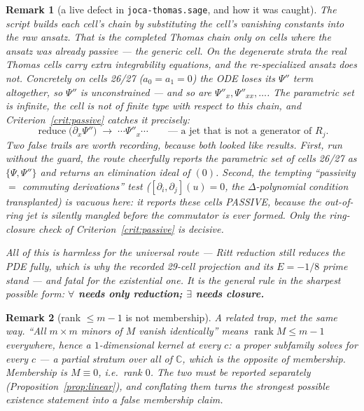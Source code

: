 \documentclass[11pt]{article}
\newcommand{\Psib}{\Psi}
\newcommand{\code}[1]{\texttt{#1}}
\newtheorem{remark}{Remark}
\begin{document}
\begin{remark}[a live defect in \code{joca-thomas.sage}, and how it was caught]
\label{rem:spec-not-passive}
The script builds each cell's chain by substituting the cell's vanishing
constants into the \emph{raw} ansatz. That is the completed Thomas chain only on
cells where the ansatz was \emph{already} passive --- the generic cell. On the
degenerate strata the real Thomas cells carry extra integrability equations, and
the re-specialized ansatz does not. Concretely on cells 26/27 ($a_0=a_1=0$) the
ODE loses its $\Psib''$ term \emph{altogether}, so $\Psib''$ is unconstrained ---
and so are $\Psib''_x, \Psib''_{xx}, \dots$. The parametric set is infinite, the
cell is not of finite type with respect to this chain, and
Criterion~\ref{crit:passive} catches it precisely:
\[
  \operatorname{reduce}\bigl(\partial_x \Psib''\bigr)
  \;\longrightarrow\; \cdots \Psib''_x \cdots \qquad
  \text{--- a jet that is not a generator of } R_j .
\]
Two false trails are worth recording, because both \emph{looked} like results.
First, run without the guard, the route cheerfully reports the parametric set of
cells 26/27 as $\{\Psib, \Psib''\}$ and returns an elimination ideal of $(0)$.
Second, the tempting ``passivity $=$ commuting derivations'' test
($[\partial_i,\partial_j](u) = 0$, the $\Delta$-polynomial condition transplanted)
is \emph{vacuous} here: it reports these cells PASSIVE, because the out-of-ring
jet is silently mangled before the commutator is ever formed. Only the
ring-closure check of Criterion~\ref{crit:passive} is decisive.

All of this is harmless for the \emph{universal} route --- Ritt reduction still
reduces the PDE fully, which is why the recorded 29-cell projection and its
$E=-1/8$ prime stand --- and fatal for the \emph{existential} one. It is the
general rule in the sharpest possible form: \textbf{$\forall$ needs only
reduction; $\exists$ needs closure.}
\end{remark}

\begin{remark}[rank $\le m-1$ is not membership]
\label{rem:rank-not-membership}
A related trap, met the same way. ``All $m\times m$ minors of $M$ vanish
identically'' means $\operatorname{rank} M \le m-1$ \emph{everywhere}, hence a
$1$-dimensional kernel at every $c$: a \emph{proper subfamily} solves for every
$c$ --- a partial stratum over all of $\mathbb{C}$, which is the \emph{opposite}
of membership. Membership is $M \equiv 0$, i.e.\ rank $0$. The two must be
reported separately (Proposition~\ref{prop:linear}), and conflating them turns
the strongest possible existence statement into a false membership claim.
\end{remark}
\end{document}
